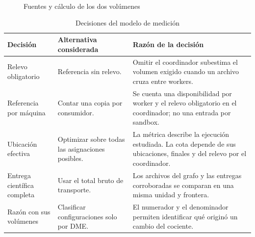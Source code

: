\begin{figure}[htbp]
\caption{Fuentes y cálculo de los dos volúmenes}
\label{fig:arquitectura}
\centering
\begin{lrbox}{\dmediagrambox}\end{lrbox}\fitdmediagram
\end{figure}

\begin{table}[htbp]\centering\small
\caption{Decisiones del modelo de medición}
\begin{tabularx}{\linewidth}{@{}P{2.65cm}YY@{}}
\toprule Decisión & Alternativa considerada & Razón de la decisión\\\midrule
Relevo obligatorio & Referencia sin relevo. & Omitir el coordinador subestima el volumen exigido cuando un archivo cruza entre workers.\\
Referencia por máquina & Contar una copia por consumidor. & Se cuenta una disponibilidad por worker y el relevo obligatorio en el coordinador; no una entrada por sandbox.\\
Ubicación efectiva & Optimizar sobre todas las asignaciones posibles. & La métrica describe la ejecución estudiada. La cota depende de sus ubicaciones, finales y del relevo por el coordinador.\\
Entrega científica completa & Usar el total bruto de transporte. & Los archivos del grafo y las entregas corroboradas se comparan en una misma unidad y frontera.\\
Razón con sus volúmenes & Clasificar configuraciones solo por DME. & El numerador y el denominador permiten identificar qué originó un cambio del cociente.\\
\bottomrule
\end{tabularx}
\end{table}
